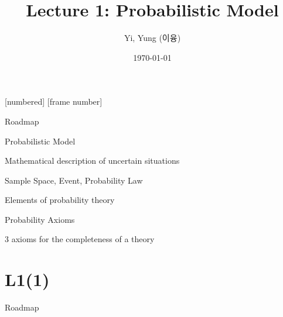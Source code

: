 

\csname\pdfmode\endcsname

{
  [numbered]
  [frame number]  %
} 


\title[]{Lecture 1: Probabilistic Model}
\author{Yi, Yung (이융)}
\date{\today}









\begin{frame}
  \titlepage
\end{frame}



\begin{frame}{Roadmap}

\plitemsep 0.3in
\bce[(1)]
\item Probabilistic Model
\bci
\item Mathematical description of uncertain situations
\eci

\item Sample Space, Event, Probability Law
\bci
\item Elements of probability theory
\eci


\item Probability Axioms
\bci
\item 3 axioms for the completeness of a theory
\eci


\ece
\end{frame}

\section{L1(1)}
\begin{frame}{Roadmap}
\bce[(1)]
\item {}

\item {}
\ece
\end{frame}



